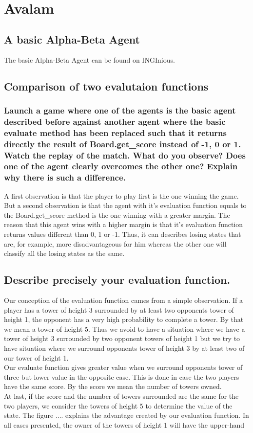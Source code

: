 \documentclass[10pt,a4paper]{article}
\begin{document}
\section{Avalam}

\subsection{A basic Alpha-Beta Agent}

The basic Alpha-Beta Agent can be found on INGInious.

\subsection{Comparison of two evalutaion functions}

\subsubsection{Launch a game where one of the agents is the basic agent described before against another agent where the basic evaluate method has been replaced such that it returns directly the result of Board.get\_score instead of -1, 0 or 1. Watch the replay of the match. What do you observe? Does one of the agent clearly overcomes the other one? Explain why there is such a difference.}

A first observation is that the player to play first is the one winning the game. But a second observation is that the agent with it's evaluation function equals to the Board.get\_score method is the one winning with a greater margin. The reason that this agent wins with a higher margin is that it's evaluation function returns values different than 0, 1 or -1. Thus, it can describes  losing states that are, for example, more disadvantageous for him whereas the other one will classify all the losing states as the same.


\subsection{Describe precisely your evaluation function.}
Our conception of the evaluation function cames from a simple observation. If a player has a tower of height 3 surrounded by at least two opponents tower of height 1, the opponent has a very high probability to complete a tower. By that we mean a tower of height 5. Thus we avoid to have a situation where we have a tower of height 3 surrounded by two opponent towers of height 1 but we try to have situation where we surround opponents tower of height 3 by at least two of our tower of height 1. \\
Our evaluate function gives greater value when we surround opponents tower of three but lower value in the opposite case. This is done in case the two players have the same score. By the score we mean the number of towers owned. \\
At last, if the score and the number of towers surrounded are the same for the two players, we consider the towers of height 5 to determine the value of the state.
The figure .... explains the advantage created by our evaluation function.
In all cases presented, the owner of the towers of height 1 will have the upper-hand
\end{document}
